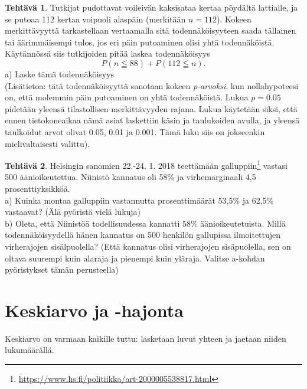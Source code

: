 \documentclass[12pt,leqno,a4paper,oneside]{amsart}
\theoremstyle{definition}
\newtheorem{exercise}{Tehtävä}
\theoremstyle{remark}
\numberwithin{equation}{section}
\begin{document}
\begin{exercise}
 Tutkijat pudottavat voileivän kaksisataa kertaa pöydältä lattialle, ja se putoaa 112 kertaa voipuoli alaspäin
 (merkitään $n=112$).
 Kokeen merkittävyyttä tarkastellaan vertaamalla sitä todennäköisyyteen saada tällainen tai äärimmäisempi tulos, jos 
 eri päin putoaminen olisi yhtä todennäköistä. Käytännössä siis tutkijoiden pitää laskea todennäköisyys
 $$P(n \leqq 88) + P(112\leqq n).$$
 a) Laske tämä todennäköisyys\\
 (Lisätietoa: tätä todennäköisyyttä sanotaan kokeen \emph{p-arvoksi}, kun nollahypoteesi on, että molemmin päin 
 putoaminen on yhtä todennäköistä. Lukua $p=0.05$ pidetään yleensä tilastollisen merkittävyyden rajana. Lukua käytetään siksi, että ennen tietokoneaikaa
  nämä asiat laskettiin käsin ja taulukoiden avulla, ja yleensä taulkoidut arvot olivat 0.05, 0.01 ja 0.001. Tämä luku siis on
  jokseenkin mielivaltaisesti valittu).
\end{exercise}

\begin{exercise}
Helsingin sanomien 22.-24. 1. 2018 teettämään galluppiin\footnote{\url{https://www.hs.fi/politiikka/art-2000005538817.html}} 
vastasi 500 äänioikeutettua. Niinistö kannatus oli 58\% ja virhemarginaali 4,5 prosenttiyksikköä.\\
a) Kuinka montaa galluppiin vastannutta prosenttimäärät 53,5\% ja 62,5\% vastaavat? (Älä pyöristä vielä lukuja)\\
b) Oleta, että Niinistöä todellisuudessa kannatti 58\% äänioikeutetuista. Millä todennäköisyydellä hänen kannatus on 
500 henkilön gallupissa ilmoitettujen virherajojen sisälpuolella? (Että kannatus olisi virherajojen sisäpuolella, sen on oltava suurempi
kuin alaraja ja pienempi kuin yläraja. Valitse a-kohdan pyöristykset tämän perusteella)
\end{exercise}

\newpage
\section{Keskiarvo ja -hajonta}

Keskiarvo on varmaan kaikille tuttu: lasketaan luvut yhteen ja jaetaan niiden lukumäärällä.

\begin{center}
\end{center}
\end{document}
